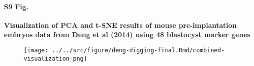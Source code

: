 \documentclass[10pt,letterpaper]{article}
\begin{document}
\paragraph*{S9 Fig.}

\label{figS9}
{\bf Visualization of PCA and t-SNE results of mouse pre-implantation embryos data from Deng et al (2014) using 48 blastocyst marker genes}
\begin{figure}[ht]
\centering
\texttt{[image: ../../src/figure/deng-digging-final.Rmd/combined-visualization-png]}
\end{figure}
\end{document}
